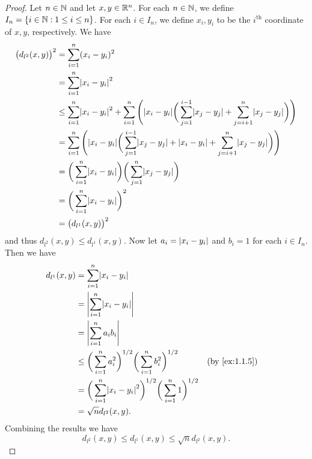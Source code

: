 \begin{proof}
  Let \(n \in \mathbb{N}\) and let \(x, y \in \mathbb{R}^n\).
  For each \(n \in \mathbb{N}\), we define \(I_n = \{i \in \mathbb{N} : 1 \leq i \leq n\}\).
  For each \(i \in I_n\), we define \(x_i, y_i\) to be the \(i^{\text{th}}\) coordinate of \(x, y\), respectively.
  We have
  \begin{align*}
    \big(d_{l^2}(x, y)\big)^2 & = \sum_{i = 1}^n (x_i - y_i)^2                                                                                                                                           \\
                              & = \sum_{i = 1}^n \abs{x_i - y_i}^2                                                                                                                                       \\
                              & \leq \sum_{i = 1}^n \abs{x_i - y_i}^2 + \sum_{i = 1}^n \Bigg(\abs{x_i - y_i} \bigg(\sum_{j = 1}^{i - 1} \abs{x_j - y_j} + \sum_{j = i + 1}^n \abs{x_j - y_j}\bigg)\Bigg) \\
                              & = \sum_{i = 1}^n \Bigg(\abs{x_i - y_i} \bigg(\sum_{j = 1}^{i - 1} \abs{x_j - y_j} + \abs{x_i - y_i} + \sum_{j = i + 1}^n \abs{x_j - y_j}\bigg)\Bigg)                     \\
                              & = \bigg(\sum_{i = 1}^n \abs{x_i - y_i}\bigg) \bigg(\sum_{j = 1}^n \abs{x_j - y_j}\bigg)                                                                                  \\
                              & = \bigg(\sum_{i = 1}^n \abs{x_i - y_i}\bigg)^2                                                                                                                           \\
                              & = \big(d_{l^1}(x, y)\big)^2
  \end{align*}
  and thus \(d_{l^2}(x, y) \leq d_{l^1}(x, y)\).
  Now let \(a_i = \left\lvert x_i - y_i\right\rvert\) and \(b_i = 1\) for each \(i \in I_n\).
  Then we have
  \begin{align*}
    d_{l^1}(x, y) & = \sum_{i = 1}^n \abs{x_i - y_i}                                                                                             \\
                  & = \abs{\sum_{i = 1}^n \abs{x_i - y_i}}                                                                                       \\
                  & = \abs{\sum_{i = 1}^n a_i b_i}                                                                                               \\
                  & \leq \bigg(\sum_{i = 1}^n a_i^2\bigg)^{1 / 2} \bigg(\sum_{i = 1}^n b_i^2\bigg)^{1 / 2}      &  & \text{(by \cref{ex:1.1.5})} \\
                  & = \bigg(\sum_{i = 1}^n \abs{x_i - y_i}^2\bigg)^{1 / 2} \bigg(\sum_{i = 1}^n 1\bigg)^{1 / 2}                                  \\
                  & = \sqrt{n} d_{l^2}(x, y).
  \end{align*}
  Combining the results we have
  \[
    d_{l^2}(x, y) \leq d_{l^1}(x, y) \leq \sqrt{n} d_{l^2}(x, y).
  \]
\end{proof}

